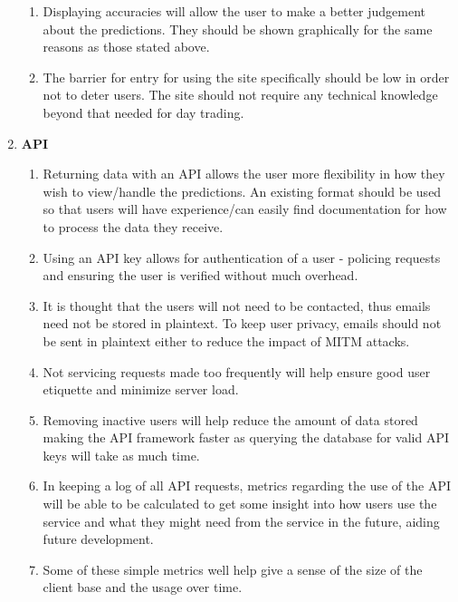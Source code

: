 \begin{enumerate}
\begin{enumerate}
                \item Displaying accuracies will allow the user to make a better judgement about the predictions. They should be shown graphically for the same reasons as those stated above.
                
                \item The barrier for entry for using the site specifically should be low in order not to deter users. The site should not require any technical knowledge beyond that needed for day trading.

            \end{enumerate}
    
            \item \textbf{API}
            
            \begin{enumerate}
                \item Returning data with an API allows the user more flexibility in how they wish to view/handle the predictions. An existing format should be used so that users will have experience/can easily find documentation for how to process the data they receive.
                
                \item Using an API key allows for authentication of a user - policing requests and ensuring the user is verified without much overhead.
                
                \item It is thought that the users will not need to be contacted, thus emails need not be stored in plaintext. To keep user privacy, emails should not be sent in plaintext either to reduce the impact of MITM attacks.  
    
                \item Not servicing requests made too frequently will help ensure good user etiquette and minimize server load.
                
                \item Removing inactive users will help reduce the amount of data stored making the API framework faster as querying the database for valid API keys will take as much time.
                
                \item In keeping a log of all API requests, metrics regarding the use of the API will be able to be calculated to get some insight into how users use the service and what they might need from the service in the future, aiding future development.
                
                \item Some of these simple metrics well help give a sense of the size of the client base and the usage over time.
            
            \end{enumerate}
        
        \end{enumerate}